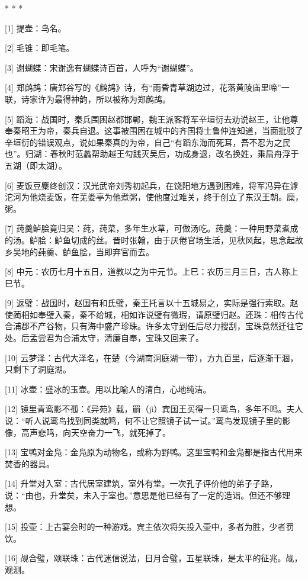 \documentclass[12pt,UTF8]{ctexbook}
\begin{document}
* * *



[1] 提壶：鸟名。

[2] 毛锥：即毛笔。

[3] 谢蝴蝶：宋谢逸有蝴蝶诗百首，人呼为“谢蝴蝶”。

[4] 郑鹧鸪：唐郑谷写的《鹧鸪》诗，有“雨昏青草湖边过，花落黄陵庙里啼”一联，诗家许为最得神韵，所以被称为郑鹧鸪。

[5] 蹈海：战国时，秦兵围困赵都邯郸，魏王派客将军辛垣衍去劝说赵王，让他尊奉秦昭王为帝，秦兵自退。这事被围困在城中的齐国将士鲁仲连知道，当面批驳了辛垣衍的错误观点，说如果秦真的为帝，自己“有蹈东海而死耳，吾不忍为之民也”。归湖：春秋时范蠡帮助越王勾践灭吴后，功成身退，改名换姓，乘扁舟浮于五湖（即太湖）。

[6] 麦饭豆麋终创汉：汉光武帝刘秀初起兵，在饶阳地方遇到困难，将军冯异在滹沱河为他烧麦饭，在芜娄亭为他煮粥，使他度过难关，终于创立了东汉王朝。糜，粥。

[7] 莼羹鲈脍竟归吴：莼，莼菜，多年生水草，可做汤吃。莼羹：一种用野菜煮成的汤。鲈脍：鲈鱼切成的丝。晋时张翰，由于厌倦官场生活，见秋风起，思念起故乡吴地的莼羹、鲈鱼脍，当即弃官而去。

[8] 中元：农历七月十五日，道教以之为中元节。上巳：农历三月三日，古人称上巳节。

[9] 返璧：战国时，赵国有和氏璧，秦王托言以十五城易之，实际是强行索取。赵使蔺相如奉璧入秦，秦不给城，相如诈说璧有微瑕，请原璧归赵。还珠：相传古代合浦郡不产谷物，只有海中盛产珍珠。许多太守到任后尽力搜刮，宝珠竟然迁往它处。后孟尝君为合浦太守，清廉自奉，宝珠又回来了。

[10] 云梦泽：古代大泽名，在楚（今湖南洞庭湖一带），方九百里，后逐渐干涸，只剩下了洞庭湖。

[11] 冰壶：盛冰的玉壶。用以比喻人的清白，心地纯洁。

[12] 镜里青鸾影不孤：《异苑》载，罽（jì）宾国王买得一只鸾鸟，多年不鸣。夫人说：“听人说鸾鸟找到同类就鸣，何不让它照镜子试一试。”鸾鸟发现镜子里的影像，高声悲鸣，向天空奋力一飞，就死掉了。

[13] 宝鸭对金凫：金凫原为动物名，或称为野鸭。这里宝鸭和金凫都是指古代用来焚香的器具。

[14] 升堂对入室：古代居室建筑，室外有堂。一次孔子评价他的弟子子路，说：“由也，升堂矣，未入于室也。”意思是他已经有了一定的造诣。但还不够理想。

[15] 投壶：上古宴会时的一种游戏。宾主依次将矢投入壶中，多者为胜，少者罚饮。

[16] 觇合璧，颂联珠：古代迷信说法，日月合璧，五星联珠，是太平的征兆。觇，观测。
\end{document}
